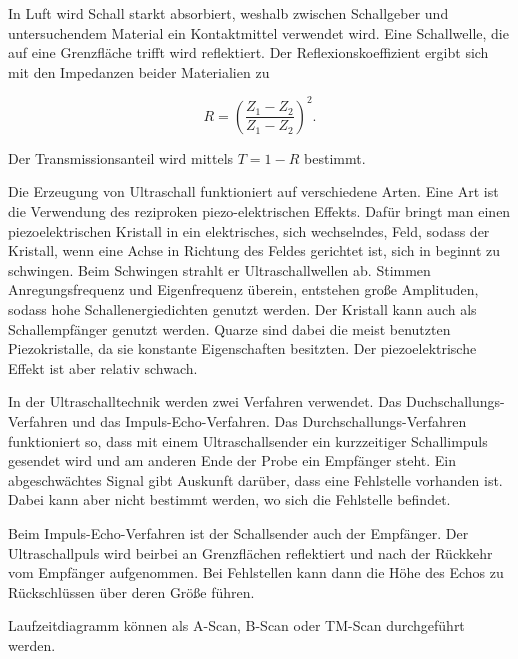 In Luft wird Schall starkt absorbiert, weshalb zwischen Schallgeber und untersuchendem Material ein Kontaktmittel verwendet wird. 
Eine Schallwelle, die auf eine Grenzfläche trifft wird reflektiert. Der Reflexionskoeffizient ergibt sich mit den Impedanzen beider Materialien zu 

\begin{equation}
    R = (\frac{Z_1-Z_2}{Z_1-Z_2})^2.
    \label{eqn:R}
\end{equation}

Der Transmissionsanteil wird mittels $T= 1-R$ bestimmt. 

Die Erzeugung von Ultraschall funktioniert auf verschiedene Arten. Eine Art ist die Verwendung des reziproken piezo-elektrischen Effekts. Dafür bringt man einen piezoelektrischen Kristall in ein elektrisches, sich wechselndes, Feld, sodass der Kristall, wenn eine Achse in Richtung des Feldes gerichtet ist, sich in beginnt zu schwingen. Beim Schwingen strahlt er Ultraschallwellen ab. 
Stimmen Anregungsfrequenz und Eigenfrequenz überein, entstehen große Amplituden, sodass hohe Schallenergiedichten genutzt werden. Der Kristall kann auch als Schallempfänger genutzt werden. Quarze sind dabei die meist benutzten Piezokristalle, da sie konstante Eigenschaften besitzten. Der piezoelektrische Effekt ist aber relativ schwach. 

In der Ultraschalltechnik werden zwei Verfahren verwendet. 
Das Duchschallungs-Verfahren und das Impuls-Echo-Verfahren. 
Das Durchschallungs-Verfahren funktioniert so, dass mit einem Ultraschallsender ein kurzzeitiger Schallimpuls gesendet wird und am anderen Ende der Probe ein Empfänger steht. Ein abgeschwächtes Signal gibt Auskunft darüber, dass eine Fehlstelle vorhanden ist. Dabei kann aber nicht bestimmt werden, wo sich die Fehlstelle befindet.

Beim Impuls-Echo-Verfahren ist der Schallsender auch der Empfänger. Der Ultraschallpuls wird beirbei an Grenzflächen reflektiert und nach der Rückkehr vom Empfänger aufgenommen. Bei Fehlstellen kann dann die Höhe des Echos zu Rückschlüssen über deren Größe führen. 

Laufzeitdiagramm können als A-Scan, B-Scan oder TM-Scan durchgeführt werden. 
